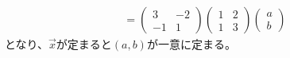 \documentclass[12pt,b5paper]{ltjsarticle}
\begin{document}
\begin{enumerate}
\begin{enumerate}
\begin{align}
             = \begin{pmatrix}3&-2\\-1&1\end{pmatrix}
             \begin{pmatrix}1 & 2\\1 & 3\end{pmatrix}
             \begin{pmatrix}a\\b\end{pmatrix}
            \end{align}
            となり、$\vec{x}$が定まると$(a,b)$が一意に定まる。
      \end{enumerate}
\end{enumerate}
\end{document}
